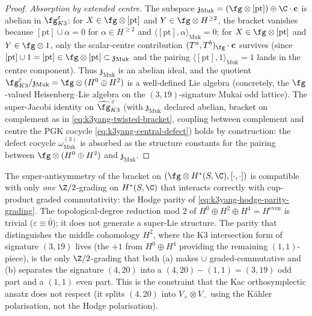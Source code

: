 \begin{proof}
\emph{Absorption by extended centre.} The subspace $\mathfrak
z_{\mathrm{Muk}} = (\fg \otimes [\mathrm{pt}]) \oplus \C \cdot
\mathbf c$ is abelian in $\fg^{\varepsilon}_{K3}$: for $X \in \fg
\otimes [\mathrm{pt}]$ and $Y \in \fg \otimes H^{\geq 2}$, the
bracket vanishes because $[\mathrm{pt}] \cup \alpha = 0$ for
$\alpha \in H^{\geq 2}$ and $\langle [\mathrm{pt}], \alpha\rangle_
{\mathrm{Muk}} = 0$; for $X \in \fg \otimes [\mathrm{pt}]$ and
$Y \in \fg \otimes 1$, only the scalar-centre contribution
$(T^a, T^b)_{\fg} \cdot \mathbf c$ survives (since $[\mathrm{pt}]
\cup 1 = [\mathrm{pt}] \in \fg \otimes [\mathrm{pt}] \subset \mathfrak
z_{\mathrm{Muk}}$ and the pairing $\langle [\mathrm{pt}], 1\rangle_
{\mathrm{Muk}} = 1$ lands in the centre component). Thus $\mathfrak
z_{\mathrm{Muk}}$ is an abelian ideal, and the quotient
$\fg^{\varepsilon}_{K3} / \mathfrak z_{\mathrm{Muk}} = \fg \otimes
(H^0 \oplus H^2)$ is a well-defined Lie algebra (concretely, the
$\fg$-valued Heisenberg--Lie algebra on the $(3, 19)$-signature
Mukai odd lattice). The super-Jacobi identity on
$\widehat{\fg}_{K3}^{\,\varepsilon}$ (with $\mathfrak z_{\mathrm
{Muk}}$ declared abelian, bracket on complement as in
\eqref{eq:k3yang-twisted-bracket}, coupling between complement
and centre the PGK cocycle \eqref{eq:k3yang-central-defect})
holds by construction: the defect cocycle $\omega^{(3)}_{\mathrm
{Muk}}$ is absorbed as the structure constants for the pairing
between $\fg \otimes (H^0 \oplus H^2)$ and $\mathfrak z_{\mathrm
{Muk}}$.
\end{proof}

\begin{remark}
\label{rem:k3yang-hodge-parity-forced}
The super-antisymmetry of the bracket on
$(\fg \otimes H^*(S, \C), [\cdot, \cdot])$ is compatible with only
\emph{one} $\Z/2$-grading on $H^*(S, \C)$ that interacts correctly
with cup-product graded commutativity: the Hodge parity of
\eqref{eq:k3yang-hodge-parity-grading}. The topological-degree
reduction mod $2$ of
$H^0 \oplus H^2 \oplus H^4 = H^{\mathrm{even}}$ is trivial
($\varepsilon \equiv \bar 0$); it does not generate a super-Lie
structure. The parity that distinguishes the middle cohomology
$H^2$, where the K3 intersection form of signature $(3, 19)$ lives (the
$+1$ from $H^0 \oplus H^4$ providing the remaining $(1, 1)$-piece),
is the only $\Z/2$-grading that both (a) makes $\cup$
graded-commutative and (b) separates the signature $(4, 20)$ into
a $(4, 20) - (1, 1) = (3, 19)$ odd part and a $(1, 1)$ even part.
This is the constraint that the Kac orthosymplectic ansatz does not
respect (it splits
$(4, 20)$ into $V_+ \otimes V_-$ using the K\"ahler polarisation,
not the Hodge polarisation).
\end{remark}

